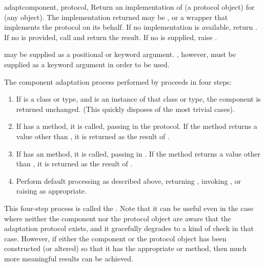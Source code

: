 \begin{verbatim%
}
\begin{verbatim%
}
\begin{funcdesc}{adapt}{component, protocol,
}
Return an implementation of  (a protocol object) for
 (any object).  The implementation returned may be
, or a wrapper that implements the protocol on its
behalf.  If no implementation is available, return .  If no
 is provided, call  and return the result.  If no  is supplied,
raise .

 may be supplied as a positional or keyword argument.
, however, must be supplied as a keyword argument in order
to be used.
\end{funcdesc}

The component adaptation process performed by  proceeds
in four steps:

\begin{enumerate}

\item If  is a class or type, and  is an instance
of that class or type, the component is returned unchanged.  (This quickly
disposes of the most trivial cases).

\item If  has a  method, it is called,
passing in the protocol.  If the method returns a value other than
, it is returned as the result of .

\item If  has an  method, it is called,
passing in .  If the method returns a value other than
, it is returned as the result of .

\item Perform default processing as described above, returning ,
invoking , or raising  as
appropriate.

\end{enumerate}

This four-step process is called the .  Note
that it can be useful even in the case where neither the component nor the
protocol object are aware that the adaptation protocol exists, and it
gracefully degrades to a kind of  check in that
case.  However, if either the component or the protocol object has been
constructed (or altered) so that it has the appropriate 
or  method, then much more meaningful results can be
achieved.


\end{verbatim%
}
\end{verbatim%
}

